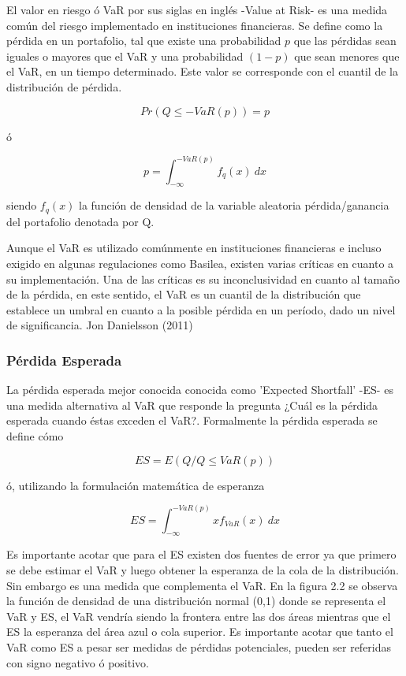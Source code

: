 \documentclass[a4paper,12pt]{Latex/Classes/PhDthesisPSnPDF}
\begin{document}
El valor en riesgo ó VaR por sus siglas en inglés -Value at Risk- es una medida común del riesgo implementado en instituciones financieras. Se define como la pérdida en un portafolio, tal que existe una probabilidad $p$ que las pérdidas sean iguales o mayores que el VaR y una probabilidad $(1-p)$ que sean menores que el VaR, en un tiempo determinado. Este valor se corresponde con el cuantil de la distribución de pérdida. 

$$ Pr(Q \leq -VaR(p)) = p $$

ó

$$ p = \int_{-\infty}^{-VaR(p)}f_{q}(x)\ dx $$

siendo $f_{q}(x)$ la función de densidad de la variable aleatoria pérdida/ganancia del portafolio denotada por Q.

Aunque el VaR es utilizado comúnmente en instituciones financieras e incluso exigido en algunas regulaciones como Basilea, existen varias críticas en cuanto a su implementación. Una de las críticas es su inconclusividad en cuanto al tamaño de la pérdida, en este sentido, el VaR es un cuantil de la distribución que establece un umbral en cuanto a la posible pérdida en un período, dado un nivel de significancia. Jon Danielsson (2011)

\subsubsection{Pérdida Esperada}

La pérdida esperada mejor conocida conocida como 'Expected Shortfall' -ES- es una medida alternativa al VaR que responde la pregunta ¿Cuál es la pérdida esperada cuando éstas exceden el VaR?. Formalmente la pérdida esperada se define cómo

$$ ES = E(Q/Q \leq VaR(p)) $$ 

ó, utilizando la formulación matemática de esperanza

$$ ES = \int_{-\infty}^{-VaR(p)} xf_{VaR}(x)\ dx $$

Es importante acotar que para el ES existen dos fuentes de error ya que primero se debe estimar el VaR y luego obtener la esperanza de la cola de la distribución. Sin embargo es una medida que complementa el VaR. En la figura 2.2 se observa la función de densidad de una distribución normal (0,1) donde se representa el VaR y ES, el VaR vendría siendo la frontera entre las dos áreas mientras que el ES la esperanza del área azul o cola superior.
Es importante acotar que tanto el VaR como ES a pesar ser medidas de pérdidas potenciales, pueden ser referidas con signo negativo ó positivo.
\end{document}
